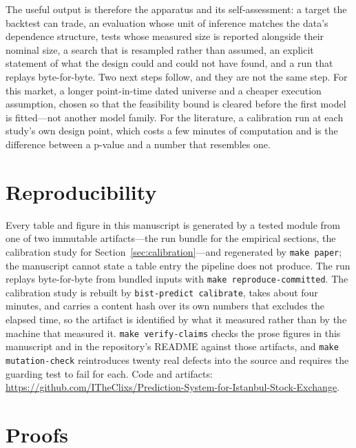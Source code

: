 \documentclass{article}
\theoremstyle{plain}
\theoremstyle{remark}
\begin{document}
The useful output is therefore the apparatus and its self-assessment: a target
the backtest can trade, an evaluation whose unit of inference matches the data's
dependence structure, tests whose measured size is reported alongside their
nominal size, a search that is resampled rather than assumed, an explicit
statement of what the design could and could not have found, and a run that
replays byte-for-byte. Two next steps follow, and they are not the same step. For
this market, a longer point-in-time dated universe and a cheaper execution
assumption, chosen so that the feasibility bound is cleared before the first
model is fitted---not another model family. For the literature, a calibration
run at each study's own design point, which costs a few minutes of computation
and is the difference between a p-value and a number that resembles one.

\section*{Reproducibility}

Every table and figure in this manuscript is generated by a tested module from
one of two immutable artifacts---the run bundle for the empirical sections, the
calibration study for Section~\ref{sec:calibration}---and regenerated by
\texttt{make paper}; the manuscript cannot state a table entry the pipeline does
not produce. The run replays byte-for-byte from bundled inputs with
\texttt{make reproduce-committed}. The calibration study is rebuilt by
\texttt{bist-predict calibrate}, takes about four minutes, and carries a content
hash over its own numbers that excludes the elapsed time, so the artifact is
identified by what it measured rather than by the machine that measured it.
\texttt{make verify-claims} checks the prose figures in this manuscript and in
the repository's README against those artifacts, and \texttt{make
mutation-check} reintroduces twenty real defects into the source and requires
the guarding test to fail for each.
Code and artifacts: \url{https://github.com/ITheClixs/Prediction-System-for-Istanbul-Stock-Exchange}.




\appendix

\section{Proofs}
\label{app:proofs}
\end{document}
